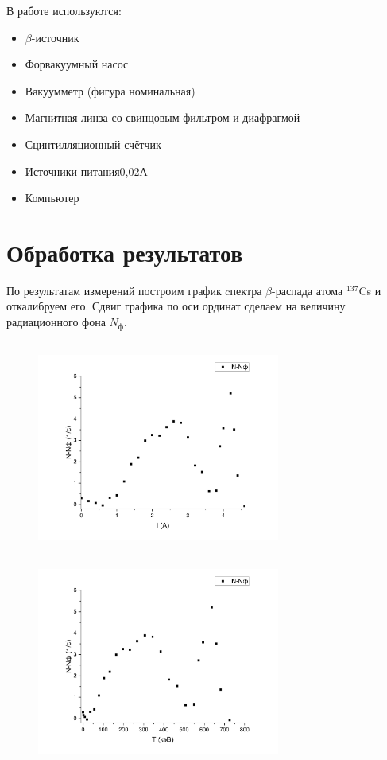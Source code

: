 \documentclass[a4paper,12pt]{article}
\theoremstyle{definition}
\newcommand{\btt}{$\beta $}
\begin{document}
	В работе используются:
	\begin{itemize}
		\item{\btt-источник}
		\item{Форвакуумный насос}
		\item{Вакуумметр (фигура номинальная)}
		\item{Магнитная линза со свинцовым фильтром и диафрагмой}
		\item{Сцинтилляционный счётчик}
		\item{Источники питания}{0,02}{А}
		\item{Компьютер}
	\end{itemize}
	
	\section{Обработка результатов}
		По результатам измерений построим график cпектра $\beta$-распада атома $^{137}$Cs и откалибруем его.
        Сдвиг графика по оси ординат сделаем на величину радиационного фона $N_\text{ф}$.
		\begin{figure}[h!]
			\begin{floatrow}
				{\includegraphics[width=8cm,height=7cm]{Graph1.pdf}}
				{\includegraphics[width=8cm,height=7cm]{Graph3.pdf}}     
			\end{floatrow}
		\end{figure}
		
\end{document}
